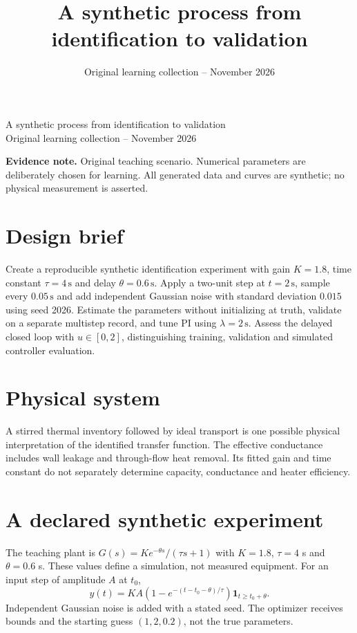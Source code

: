 \documentclass[10pt,a4paper]{article}
\title{\color{ink}A synthetic process from identification to validation}
\author{}
\date{Original learning collection -- November 2026}
\begin{document}
\begin{center}{\LARGE\color{ink}A synthetic process from identification to validation}\\[5pt]{\small Original learning collection -- November 2026}\end{center}

\textbf{Evidence note.} Original teaching scenario. Numerical parameters are deliberately chosen for learning. All generated data and curves are synthetic; no physical measurement is asserted.
\section{Design brief}
Create a reproducible synthetic identification experiment with gain $K=1.8$, time constant $\tau=4\,\mathrm{s}$ and delay $\theta=0.6\,\mathrm{s}$. Apply a two-unit step at $t=2\,\mathrm{s}$, sample every $0.05\,\mathrm{s}$ and add independent Gaussian noise with standard deviation $0.015$ using seed 2026. Estimate the parameters without initializing at truth, validate on a separate multistep record, and tune PI using $\lambda=2\,\mathrm{s}$. Assess the delayed closed loop with $u\in[0,2]$, distinguishing training, validation and simulated controller evaluation.
\section{Physical system}
\begin{center}\resizebox{.88\linewidth}{!}{}\par{\small A stirred thermal inventory followed by ideal transport is one possible physical interpretation of the identified transfer function. The effective conductance includes wall leakage and through-flow heat removal. Its fitted gain and time constant do not separately determine capacity, conductance and heater efficiency.}\end{center}
\section{A declared synthetic experiment}
The teaching plant is $G(s)=K e^{-\theta s}/(\tau s+1)$ with $K=1.8$, $\tau=4$ s and $\theta=0.6$ s. These values define a simulation, not measured equipment. For an input step of amplitude $A$ at $t_0$,
\[y(t)=KA\left(1-e^{-(t-t_0-\theta)/\tau}\right)\mathbf1_{t\ge t_0+\theta}.\]
Independent Gaussian noise is added with a stated seed. The optimizer receives bounds and the starting guess $(1,2,0.2)$, not the true parameters.
\end{document}
